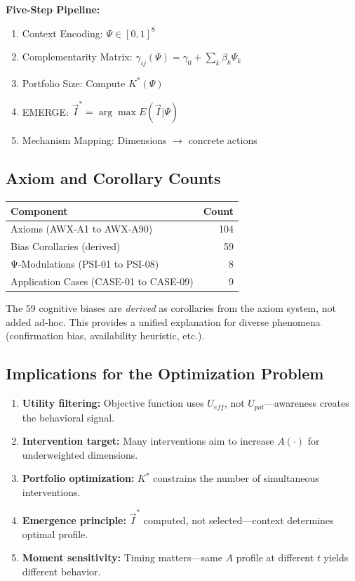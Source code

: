 \textbf{Five-Step Pipeline:}
\begin{enumerate}[nosep]
\item Context Encoding: $\Psi \in [0,1]^8$
\item Complementarity Matrix: $\gamma_{ij}(\Psi) = \gamma_0 + \sum_k \beta_k \Psi_k$
\item Portfolio Size: Compute $K^*(\Psi)$
\item EMERGE: $\vec{I}^* = \arg\max E(\vec{I} | \Psi)$
\item Mechanism Mapping: Dimensions $\to$ concrete actions
\end{enumerate}

\subsection{Axiom and Corollary Counts}

\begin{center}
\renewcommand{\arraystretch}{1.2}
\begin{tabular}{@{}lr@{}}
\toprule
\textbf{Component} & \textbf{Count} \\
\midrule
Axioms (AWX-A1 to AWX-A90) & 104 \\
Bias Corollaries (derived) & 59 \\
Ψ-Modulations (PSI-01 to PSI-08) & 8 \\
Application Cases (CASE-01 to CASE-09) & 9 \\
\bottomrule
\end{tabular}
\end{center}

The 59 cognitive biases are \emph{derived} as corollaries from the axiom system, not added ad-hoc. This provides a unified explanation for diverse phenomena (confirmation bias, availability heuristic, etc.).

\subsection{Implications for the Optimization Problem}

\begin{enumerate}[nosep]
\item \textbf{Utility filtering:} Objective function uses $U_{eff}$, not $U_{pot}$---awareness creates the behavioral signal.
\item \textbf{Intervention target:} Many interventions aim to increase $A(\cdot)$ for underweighted dimensions.
\item \textbf{Portfolio optimization:} $K^*$ constrains the number of simultaneous interventions.
\item \textbf{Emergence principle:} $\vec{I}^*$ computed, not selected---context determines optimal profile.
\item \textbf{Moment sensitivity:} Timing matters---same $A$ profile at different $t$ yields different behavior.
\end{enumerate}

